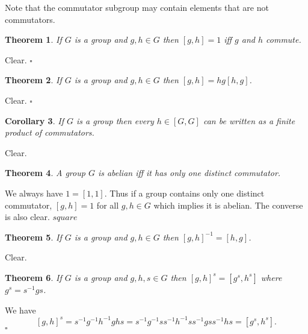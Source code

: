 \documentclass[10pt]{article}
\newtheorem{theorem}{Theorem}[section]
\newtheorem{corollary}[theorem]{Corollary}
\newenvironment{proof}[1][Proof]{\begin{trivlist}
\item[\hskip \labelsep {\itshape #1}]}{\end{trivlist}}
\begin{document}
Note that the commutator subgroup may contain elements that are not commutators.

\begin{theorem}
If $G$ is a group and $g, h \in G$ then $[g, h] = 1$ iff $g$ and $h$ commute.
\end{theorem}

\begin{proof}
Clear. $\square$
\end{proof}

\begin{theorem}
If $G$ is a group and $g, h \in G$ then $[g, h] = hg[h, g]$.
\end{theorem}

\begin{proof}
Clear. $\square$
\end{proof}

\begin{corollary}
If $G$ is a group then every $h \in [G, G]$ can be written as a finite product of commutators.
\end{corollary}

\begin{proof}
Clear.
\end{proof}

\begin{theorem}
A group $G$ is abelian iff it has only one distinct commutator.
\end{theorem}

\begin{proof}
We always have $1 = [1, 1]$. Thus if a group contains only one distinct commutator, $[g, h] = 1$ for all $g, h \in G$ which implies it is abelian. The converse is also clear. $square$
\end{proof}

\begin{theorem}
If $G$ is a group and $g, h \in G$ then $[g, h]^{-1} = [h, g]$.
\end{theorem}

\begin{proof}
Clear.
\end{proof}

\begin{theorem}
If $G$ is a group and $g, h, s \in G$ then $[g, h]^s = [g^s, h^s]$ where $g^s = s^{-1}gs$.
\end{theorem}

\begin{proof}
We have
$$[g, h]^s = s^{-1}g^{-1}h^{-1}ghs = s^{-1}g^{-1}ss^{-1}h^{-1}ss^{-1}gss^{-1}hs = [g^s, h^s].$$
$\square$
\end{proof}
\end{document}
